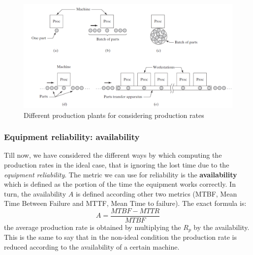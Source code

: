 \begin{figure}
    \centering
    \includegraphics[scale=0.6]{img/production_rates.png}
    \caption{Different production plants for considering production rates}
\end{figure}

\subsubsection{Equipment reliability: availability}
Till now, we have considered the different ways by which computing the production rates in the ideal case, that is ignoring the lost time due to the \textit{equipment reliability}. The metric we can use for reliability is the \textbf{availability} which is defined as the portion of the time the equipment works correctly. In turn, the availability $A$ is defined according other two metrics (MTBF, Mean Time Between Failure and MTTF, Mean Time to failure). The exact formula is: 
\begin{equation}
    A=\frac{MTBF-MTTR}{MTBF}
\end{equation}
the average production rate is obtained by multiplying the $R_p$ by the availability. This is the same to say that in the non-ideal condition the production rate is reduced according to the availability of a certain machine.

